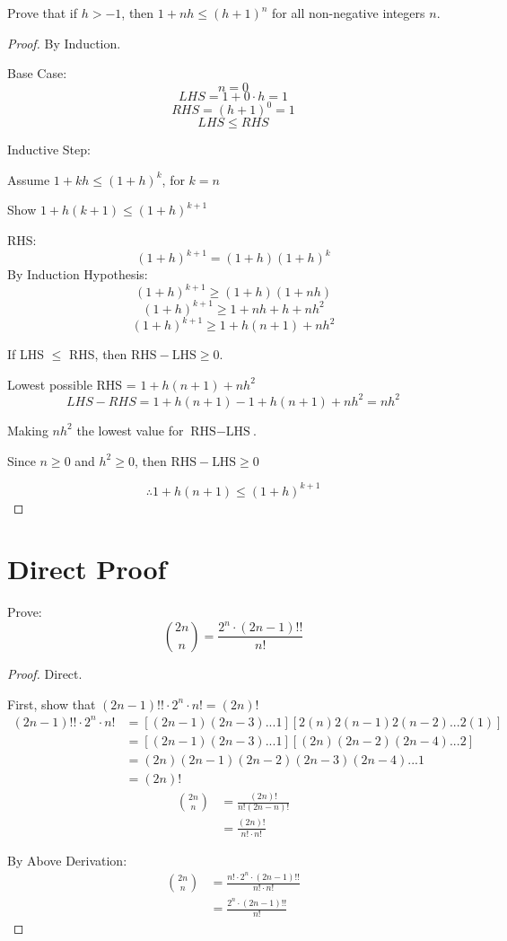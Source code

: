 \documentclass[12pt]{article}
\begin{document}
\newpage
\begin{flushleft}
Prove that if $h > -1$, then $1 + nh \leq (h+1)^n$ for all non-negative integers $n$.
\end{flushleft}
\begin{proof}
By Induction.

Base Case:
$$n = 0$$
$$LHS = 1 + 0\cdot h = 1$$
$$RHS = (h+1)^0 = 1$$
$$LHS \leq RHS$$

Inductive Step:

Assume $1 + kh \leq (1+h)^k$, for $k = n$

Show $1 + h(k + 1) \leq (1+h)^{k+1}$

RHS:
$$(1+h)^{k+1} = (1+h)(1+h)^k$$
By Induction Hypothesis:
$$(1+h)^{k+1} \geq (1+h)(1+nh)$$
$$(1+h)^{k+1} \geq 1+nh+h+nh^2$$
$$(1+h)^{k+1} \geq 1+h(n+1)+nh^2$$

If LHS $\leq$ RHS, then $\text{RHS} - \text{LHS} \geq 0$. 

Lowest possible RHS = $1+h(n+1)+nh^2$
$$LHS - RHS = 1 + h(n + 1) - 1+h(n+1)+nh^2 = nh^2$$

Making $nh^2$ the lowest value for $\text{RHS} - \text{LHS}$.

Since $n \geq 0$ and $h^2 \geq 0$, then  $\text{RHS} - \text{LHS} \geq 0$


$$\therefore 1 + h(n + 1) \leq (1+h)^{k+1}$$

\end{proof}

\newpage
\section{Direct Proof}

Prove:
$$\binom{2n}{n} = \frac{2^n \cdot (2n-1)!!}{n!}$$
\begin{proof}
Direct.

First, show that $(2n-1)!! \cdot 2^n \cdot n! = (2n)!$
\begin{align*}
(2n-1)!! \cdot 2^n \cdot n! &= [(2n-1)(2n-3)...1][2(n)2(n-1)2(n-2)...2(1)]\\
&= [(2n-1)(2n-3)...1][(2n)(2n-2)(2n-4)...2]\\
&= (2n)(2n-1)(2n-2)(2n-3)(2n-4)...1\\
&= (2n)!
\end{align*}
\begin{align*}
\binom{2n}{n} &= \frac{(2n)!}{n!(2n - n)!}\\
&= \frac{(2n)!}{n! \cdot n!}
\end{align*}

By Above Derivation:
\begin{align*}
\binom{2n}{n} &= \frac{n! \cdot 2^n \cdot (2n-1)!!}{n! \cdot n!}\\
&= \frac{2^n \cdot (2n-1)!!}{n!}
\end{align*}

\end{proof}
\end{document}
